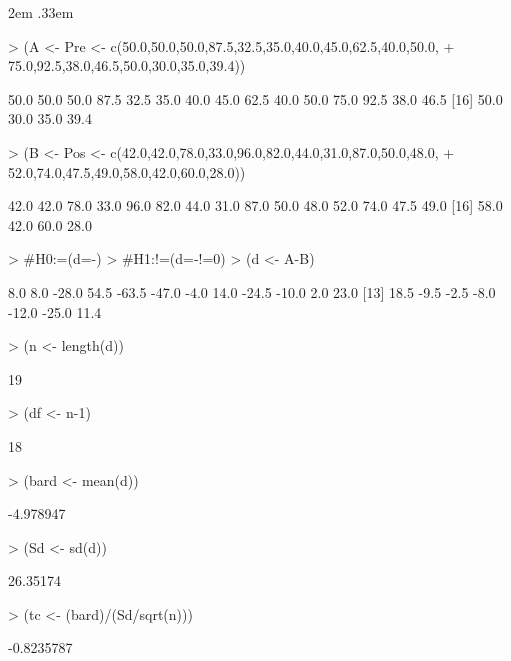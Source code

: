 \documentclass{article}
\newenvironment{ManualExercise}
  {\begin{list}{}{\leftmargin \QuestionIndent
    \partopsep0pt \parsep\parskip \topsep\QuestionBefore
    \itemsep\QuestionBefore \labelwidth2em
    \labelsep.33em
    \usecounter{Question}}}
  {\end{list}}
\begin{document}
\begin{Exercise}
\begin{ManualExercise}
\begin{Schunk}
\begin{Sinput}
> (A <- Pre <- c(50.0,50.0,50.0,87.5,32.5,35.0,40.0,45.0,62.5,40.0,50.0,
+                75.0,92.5,38.0,46.5,50.0,30.0,35.0,39.4))
\end{Sinput}
\begin{Soutput}
 [1] 50.0 50.0 50.0 87.5 32.5 35.0 40.0 45.0 62.5 40.0 50.0 75.0 92.5 38.0 46.5
[16] 50.0 30.0 35.0 39.4
\end{Soutput}
\begin{Sinput}
> (B <- Pos <- c(42.0,42.0,78.0,33.0,96.0,82.0,44.0,31.0,87.0,50.0,48.0,
+                52.0,74.0,47.5,49.0,58.0,42.0,60.0,28.0))
\end{Sinput}
\begin{Soutput}
 [1] 42.0 42.0 78.0 33.0 96.0 82.0 44.0 31.0 87.0 50.0 48.0 52.0 74.0 47.5 49.0
[16] 58.0 42.0 60.0 28.0
\end{Soutput}
\begin{Sinput}
> #H0:\muA=\muB (d=\muA-)
> #H1:\muA!=\muB (d=\muA-\muB!=0)
> (d <- A-B)
\end{Sinput}
\begin{Soutput}
 [1]   8.0   8.0 -28.0  54.5 -63.5 -47.0  -4.0  14.0 -24.5 -10.0   2.0  23.0
[13]  18.5  -9.5  -2.5  -8.0 -12.0 -25.0  11.4
\end{Soutput}
\begin{Sinput}
> (n <- length(d))
\end{Sinput}
\begin{Soutput}
[1] 19
\end{Soutput}
\begin{Sinput}
> (df <- n-1)
\end{Sinput}
\begin{Soutput}
[1] 18
\end{Soutput}
\begin{Sinput}
> (bard <- mean(d))
\end{Sinput}
\begin{Soutput}
[1] -4.978947
\end{Soutput}
\begin{Sinput}
> (Sd <- sd(d))
\end{Sinput}
\begin{Soutput}
[1] 26.35174
\end{Soutput}
\begin{Sinput}
> (tc <- (bard)/(Sd/sqrt(n)))
\end{Sinput}
\begin{Soutput}
[1] -0.8235787
\end{Soutput}

\end{Schunk}
\end{ManualExercise}
\end{Exercise}
\end{document}
